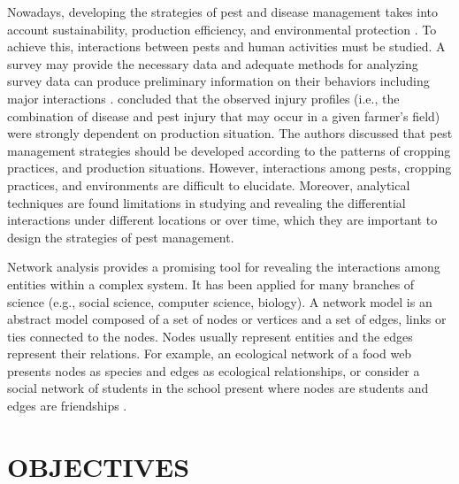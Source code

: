Nowadays, developing the strategies of pest and disease management takes into account sustainability, production efficiency, and environmental protection . To achieve this, interactions between pests and human activities must be studied. A survey may provide the necessary data and adequate methods for analyzing survey data can produce preliminary information on their behaviors including major interactions .  concluded that the observed injury profiles (i.e., the combination of disease and pest injury that may occur in a given farmer’s field) were strongly dependent on production situation.  The authors discussed that pest management strategies should be developed according to the patterns of cropping practices, and production situations. However, interactions among pests, cropping practices, and environments are difficult to elucidate. Moreover,  analytical techniques are found limitations in studying and revealing  the differential interactions under different locations or over time, which they are important to design the strategies of pest management. 

Network analysis provides a promising tool for revealing the interactions among entities within a complex system. It has been applied for many branches of science (e.g., social science, computer science, biology). A network model is an abstract model composed of a set of nodes or vertices and a set of edges, links or ties connected to the nodes. Nodes usually represent entities and the edges represent their relations. For example, an ecological network of a food web presents nodes as species  and edges as ecological relationships, or consider a social network of students in the school present where nodes are students and edges are friendships .

\section*{OBJECTIVES}


